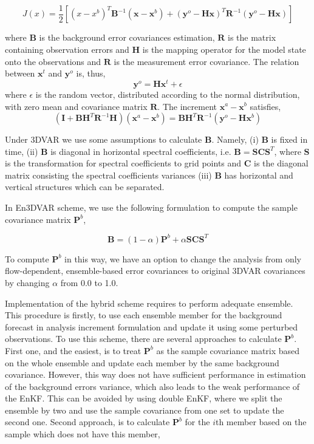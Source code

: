 \documentclass[a4,12pt]{article}
\begin{document}
$$J(x) = \frac{1}{2}[(x-x^{b})^{T}\textbf{B}^{-1}(\textbf{x}-\textbf{x}^{b})+(\textbf{y}^{o}-\textbf{H}\textbf{x})^{T}\textbf{R}^{-1}(\textbf{y}^{o}-\textbf{Hx})]$$

where $\textbf{B}$ is the background error covariances estimation, $\textbf{R}$ is the matrix containing observation errors and $\textbf{H}$ is the mapping operator for the model state onto the observations and  $\textbf{R}$ is the measurement error covariance. The relation between $\textbf{x}^{t}$ and $\textbf{y}^{o}$ is, thus, $$\textbf{y}^{o} = \textbf{H}\textbf{x}^{t} + \epsilon$$ where $\epsilon$ is the random vector, distributed according to the normal distribution, with zero mean and covariance matrix $\textbf{R}$. The increment $\textbf{x}^{a} - \textbf{x}^{b}$ satisfies, 
$$(\textbf{I} + \textbf{BH}^{T}\textbf{R}^{-1}\textbf{H})(\textbf{x}^{a}-\textbf{x}^{b}) = \textbf{B}\textbf{H}^{T}\textbf{R}^{-1}(\textbf{y}^{o}-\textbf{H}\textbf{x}^{b})$$   

Under 3DVAR we use some assumptions to calculate $\textbf{B}$. Namely, (i) $\textbf{B}$ is fixed in time, (ii) $\textbf{B}$ is diagonal in horizontal spectral coefficients, i.e. $\textbf{B} = \textbf{S}\textbf{C}\textbf{S}^{T}$, where $\textbf{S}$ is the transformation for spectral coefficients to grid points and $\textbf{C}$ is the diagonal matrix consisting the spectral coefficients variances (iii) $\textbf{B}$ has horizontal and vertical structures which can be separated.

In En3DVAR scheme, we use the following formulation to compute the sample covariance matrix $\textbf{P}^{b}$,

$$\textbf{B} = (1 - \alpha)\textbf{P}^{b} + \alpha \textbf{S}\textbf{C}\textbf{S}^{T}$$

To compute $\textbf{P}^{b}$ in this way, we have an option to change the analysis from only flow-dependent, ensemble-based error covariances to original 3DVAR covariances by changing $\alpha$ from 0.0 to 1.0.

Implementation of the hybrid scheme requires to perform adequate ensemble. This procedure is firstly, to use each ensemble member for the background forecast in analysis increment formulation and update it using some perturbed observations. To use this scheme, there are several approaches to calculate $\textbf{P}^{b}$. First one, and the easiest, is to treat $\textbf{P}^{b}$ as the sample covariance matrix based on the whole ensemble and update each member by the same background covariance. However, this way does not have sufficient performance in estimation of the background errors variance, which also leads to the weak performance of the EnKF. This can be avoided by using double EnKF, where we split the ensemble by two and use the sample covariance from one set to update the second one. Second approach, is to calculate $\textbf{P}^{b}$ for the $i$th member based on the sample which does not have this member, 
\end{document}
